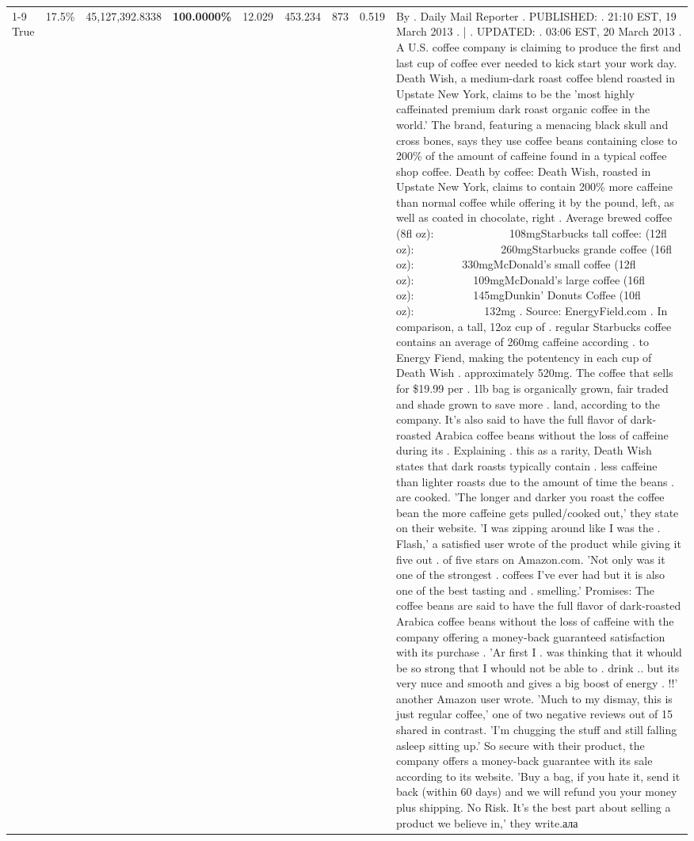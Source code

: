 \begin{table}[H]
{\begin{tabular}{lllrlllll}
\cline{1-9}
True & 17.5\% & 45,127,392.8338 & \bfseries \color{red} 100.0000\% & 12.029 & 453.234 & 873 & 0.519 & By . Daily Mail Reporter . PUBLISHED: . 21:10 EST, 19 March 2013 . | . UPDATED: . 03:06 EST, 20 March 2013 . A U.S. coffee company is claiming to produce the first and last cup of coffee ever needed to kick start your work day. Death Wish, a medium-dark roast coffee blend roasted in Upstate New York, claims to be the 'most highly caffeinated premium dark roast organic coffee in the world.' The brand, featuring a menacing black skull and cross bones, says they use coffee beans containing close to 200\% of the amount of caffeine found in a typical coffee shop coffee. Death by coffee: Death Wish, roasted in Upstate New York, claims to contain 200\% more caffeine than normal coffee while offering it by the pound, left, as well as coated in chocolate, right . Average brewed coffee (8fl oz):              108mgStarbucks tall coffee: (12fl oz):                260mgStarbucks grande coffee (16fl oz):         330mgMcDonald's small coffee (12fl oz):           109mgMcDonald's large coffee (16fl oz):           145mgDunkin' Donuts Coffee (10fl oz):             132mg . Source: EnergyField.com . In comparison, a tall, 12oz cup of . regular Starbucks coffee contains an average of 260mg caffeine according . to Energy Fiend, making the potentency in each cup of Death Wish . approximately 520mg. The coffee that sells for \$19.99 per . 1lb bag is organically grown, fair traded and shade grown to save more . land, according to the company. It's also said to have the full flavor of dark-roasted Arabica coffee beans without the loss of caffeine during its . Explaining . this as a rarity, Death Wish states that dark roasts typically contain . less caffeine than lighter roasts due to the amount of time the beans . are cooked. 'The longer and darker you roast the coffee bean the more caffeine gets pulled/cooked out,' they state on their website. 'I was zipping around like I was the . Flash,' a satisfied user wrote of the product while giving it five out . of five stars on Amazon.com. 'Not only was it one of the strongest . coffees I've ever had but it is also one of the best tasting and . smelling.’ Promises: The coffee beans are said to have the full flavor of dark-roasted Arabica coffee beans without the loss of caffeine with the company offering a money-back guaranteed satisfaction with its purchase . 'Ar first I . was thinking that it whould be so strong that I whould not be able to . drink .. but its very nuce and smooth and gives a big boost of energy . !!' another Amazon user wrote. 'Much to my dismay, this is just regular coffee,' one of two negative reviews out of 15 shared in contrast. 'I'm chugging the stuff and still falling asleep sitting up.' So secure with their product, the company offers a money-back guarantee with its sale according to its website. 'Buy a bag, if you hate it, send it back (within 60 days) and we will refund you your money plus shipping. No Risk. It’s the best part about selling a product we believe in,' they write.ала \\

\end{tabular}}
\end{table}
